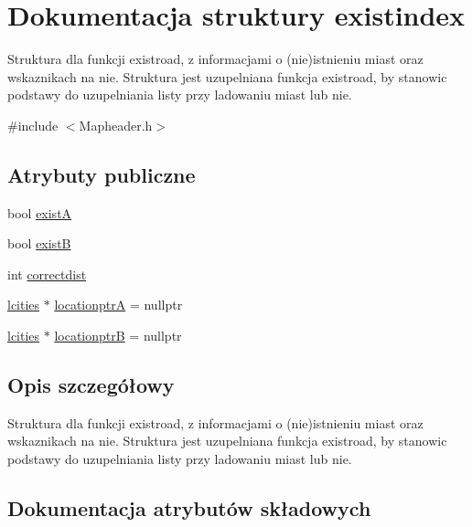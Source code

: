 \hypertarget{structexistindex}{}\section{Dokumentacja struktury existindex}
\label{structexistindex}


Struktura dla funkcji existroad, z informacjami o (nie)istnieniu miast oraz wskaznikach na nie. Struktura jest uzupelniana funkcja existroad, by stanowic podstawy do uzupelniania listy przy ladowaniu miast lub nie.  




{\ttfamily \#include $<$Mapheader.\+h$>$}

\subsection*{Atrybuty publiczne}
\begin{DoxyCompactItemize}
\item 
bool \mbox{\hyperlink{structexistindex_a0638291657c5a0cd38cc979e66bd58da}{existA}}
\item 
bool \mbox{\hyperlink{structexistindex_ab2d8d4d0afa56f1f1e131423674bbbf1}{existB}}
\item 
int \mbox{\hyperlink{structexistindex_ae41cd59f04d4c9fc234aa14ce1bed3f5}{correctdist}}
\item 
\mbox{\hyperlink{structlcities}{lcities}} $\ast$ \mbox{\hyperlink{structexistindex_a78aac5475c8f83ee75289143aefa3d38}{locationptrA}} = nullptr
\item 
\mbox{\hyperlink{structlcities}{lcities}} $\ast$ \mbox{\hyperlink{structexistindex_a2ce546bc2977c9c9e11eedf030fc8bd2}{locationptrB}} = nullptr
\end{DoxyCompactItemize}


\subsection{Opis szczegółowy}
Struktura dla funkcji existroad, z informacjami o (nie)istnieniu miast oraz wskaznikach na nie. Struktura jest uzupelniana funkcja existroad, by stanowic podstawy do uzupelniania listy przy ladowaniu miast lub nie. 

\subsection{Dokumentacja atrybutów składowych}
\mbox{\label{structexistindex_ae41cd59f04d4c9fc234aa14ce1bed3f5}} 

